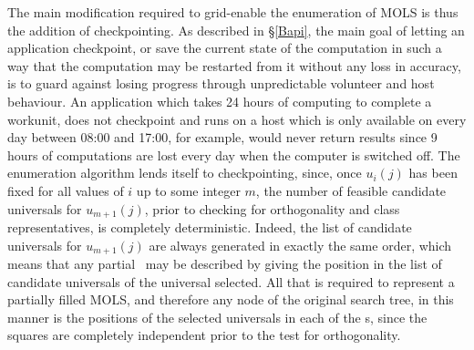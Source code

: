 The main modification required to grid-enable the   enumeration of MOLS is thus the addition of checkpointing. As described in \S\ref{Bapi}, the main goal of letting an application checkpoint, or save the current state of the computation in such a way that the computation may be restarted from it without any loss in accuracy, is to guard against losing progress through unpredictable volunteer and host behaviour. An application which takes 24 hours of computing to complete a workunit, does not checkpoint and runs on a host which is only available on every day between 08:00 and 17:00, for example, would never return results since 9 hours of computations are lost every day when the computer is switched off. The enumeration algorithm lends itself to checkpointing, since, once $u_i(j)$ has been fixed for all values of $i$ up to some integer $m$, the number of feasible candidate universals for $u_{m+1}(j)$, prior to checking for orthogonality and class representatives, is completely deterministic. Indeed, the   list of candidate universals for $u_{m+1}(j)$ are always generated in exactly the same order, which means that any partial \lat \ may be described by giving the position in the list of candidate universals of the universal selected. All that is required to represent a partially filled MOLS, and therefore any node of the original search tree, in this manner is the positions of the selected universals in each of the \lat s, since the squares are completely independent prior to the test for orthogonality.

